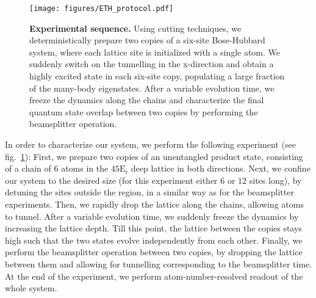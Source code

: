 
\begin{figure}[t]
	\centering
	\texttt{[image: figures/ETH\_protocol.pdf]}
	\caption{{\bf Experimental sequence.} Using cutting techniques, we deterministically prepare two copies of a six-site Bose-Hubbard system, where each lattice site is initialized with a single atom. We suddenly switch on the tunnelling in the x-direction and obtain a highly excited state in each six-site copy, populating a large fraction of the many-body eigenstates. After a variable evolution time, we freeze the dynamics along the chains and characterize the final quantum state overlap between two copies by performing the beamsplitter operation.}
	
	\label{fig:CBH_purity_protocol}
\end{figure} 

In order to characterize our system, we perform the following experiment (see fig.~\ref{fig:CBH_purity_protocol}): First, we prepare two copies of an unentangled product state, consisting of a chain of $6$ atoms in the $45\mathrm{E_r}$ deep lattice in both directions. Next, we confine our system to the desired size (for this experiment either $6$ or $12$ sites long), by detuning the sites outside the region, in a similar way as for the beamsplitter experiments. Then, we rapidly drop the lattice along the chains, allowing atoms to tunnel. After a variable evolution time, we suddenly freeze the dynamics by increasing the lattice depth. Till this point, the lattice between the copies stays high such that the two states evolve independently from each other. Finally, we perform the beamsplitter operation between two copies, by dropping the lattice between them and allowing for tunnelling corresponding to the beamsplitter time. At the end of the experiment, we perform atom-number-resolved readout of the whole system.

